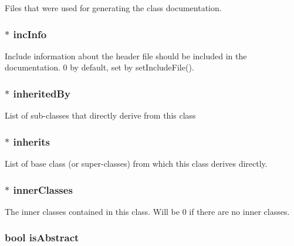 Files that were used for generating the class documentation. \hypertarget{class_class_def_impl_a0cba66a9f6ffe861a51b9be202714bb2}{
\subsubsection[{inc\-Info}]{$\ast$ inc\-Info}}\label{class_class_def_impl_a0cba66a9f6ffe861a51b9be202714bb2}
Include information about the header file should be included in the documentation. 0 by default, set by set\-Include\-File(). \hypertarget{class_class_def_impl_a2a84a13b04588770007b79363d29cd86}{
\subsubsection[{inherited\-By}]{$\ast$ inherited\-By}}\label{class_class_def_impl_a2a84a13b04588770007b79363d29cd86}
List of sub-\/classes that directly derive from this class \hypertarget{class_class_def_impl_a8b9018b192f2f9004f8b058ba1d4d4ed}{
\subsubsection[{inherits}]{$\ast$ inherits}}\label{class_class_def_impl_a8b9018b192f2f9004f8b058ba1d4d4ed}
List of base class (or super-\/classes) from which this class derives directly. \hypertarget{class_class_def_impl_af8c782281ef14751085df442d8f248c8}{
\subsubsection[{inner\-Classes}]{$\ast$ inner\-Classes}}\label{class_class_def_impl_af8c782281ef14751085df442d8f248c8}
The inner classes contained in this class. Will be 0 if there are no inner classes. \hypertarget{class_class_def_impl_a8b6a66ac3f44c050d77ae0b675fe6e00}{
\subsubsection[{is\-Abstract}]{\setlength{\rightskip}{0pt plus 5cm}bool is\-Abstract}}\label{class_class_def_impl_a8b6a66ac3f44c050d77ae0b675fe6e00}
